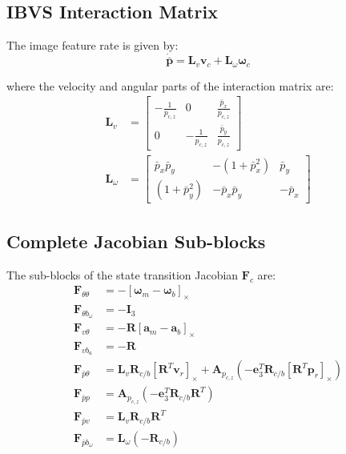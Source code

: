 \documentclass[11pt,a4paper]{article}
\newcommand{\pr}{\mathbf{p}_r}
\newcommand{\vr}{\mathbf{v}_r}
\newcommand{\pbar}{\bar{\mathbf{p}}}
\newcommand{\bgyr}{\bm{\omega}_b}
\newcommand{\bacc}{\mathbf{a}_b}
\newcommand{\R}{\mathbf{R}}
\newcommand{\I}{\mathbf{I}}
\renewcommand{\skew}[1]{\left[#1\right]_\times}
\begin{document}
\subsection{IBVS Interaction Matrix}
The image feature rate is given by:
\begin{equation}
    \dot{\pbar} = \mathbf{L}_v \mathbf{v}_c + \mathbf{L}_\omega \bm{\omega}_c
\end{equation}

where the velocity and angular parts of the interaction matrix are:
\begin{align}
    \mathbf{L}_v &= \begin{bmatrix}
        -\frac{1}{p_{c,z}} & 0 & \frac{\bar{p}_x}{p_{c,z}} \\[4pt]
        0 & -\frac{1}{p_{c,z}} & \frac{\bar{p}_y}{p_{c,z}}
    \end{bmatrix} \\[10pt]
    \mathbf{L}_\omega &= \begin{bmatrix}
        \bar{p}_x \bar{p}_y & -(1+\bar{p}_x^2) & \bar{p}_y \\[4pt]
        (1+\bar{p}_y^2) & -\bar{p}_x \bar{p}_y & -\bar{p}_x
    \end{bmatrix}
\end{align}

\subsection{Complete Jacobian Sub-blocks}
The sub-blocks of the state transition Jacobian $\mathbf{F}_c$ are:
\begin{align}
    \mathbf{F}_{\theta\theta} &= -\skew{\bm{\omega}_m - \bgyr} \\[6pt]
    \mathbf{F}_{\theta b_\omega} &= -\I_3 \\[6pt]
    \mathbf{F}_{v\theta} &= -\R \skew{\mathbf{a}_m - \bacc} \\[6pt]
    \mathbf{F}_{v b_a} &= -\R \\[6pt]
    \mathbf{F}_{\bar{p}\theta} &= \mathbf{L}_v \R_{c/b} \skew{\R^T \vr} + \mathbf{A}_{p_{c,z}} \left(-\mathbf{e}_3^T \R_{c/b} \skew{\R^T \pr}\right) \\[6pt]
    \mathbf{F}_{\bar{p}p} &= \mathbf{A}_{p_{c,z}} \left(-\mathbf{e}_3^T \R_{c/b} \R^T\right) \\[6pt]
    \mathbf{F}_{\bar{p}v} &= \mathbf{L}_v \R_{c/b} \R^T \\[6pt]
    \mathbf{F}_{\bar{p}b_\omega} &= \mathbf{L}_\omega (-\R_{c/b})
\end{align}
\end{document}
